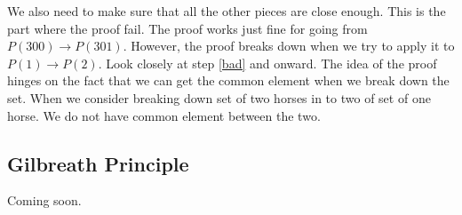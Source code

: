 \documentclass[a4paper, 12pt]{article}
\theoremstyle{examplestyle}
\begin{document}
\begin{multicols}{2}
We also need to make sure that all the other pieces are close enough. This is the part where the proof fail. The proof works just fine for going from $P(300) \to P(301)$. However, the proof breaks down when we try to apply it to $P(1) \to P(2)$. Look closely at step \ref{bad} and onward. The idea of the proof hinges on the fact that we can get the common element when we break down the set. When we consider breaking down set of two horses in to two of set of one horse. We do not have common element between the two.


\subsection*{Gilbreath Principle}

Coming soon.








\end{multicols}
\end{document}
